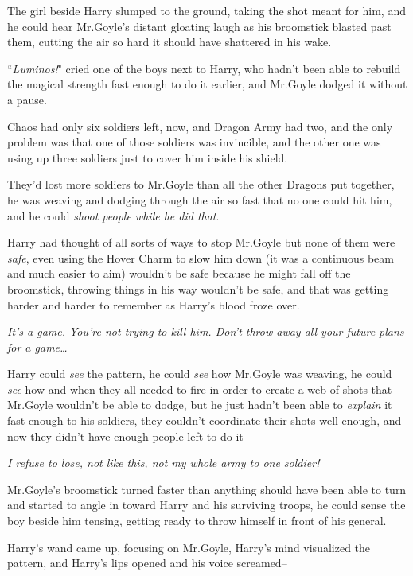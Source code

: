 \later

The girl beside Harry slumped to the ground, taking the shot meant for him, and he could hear Mr.\?Goyle's distant gloating laugh as his broomstick blasted past them, cutting the air so hard it should have shattered in his wake.

``\emph{Luminos!}" cried one of the boys next to Harry, who hadn't been able to rebuild the magical strength fast enough to do it earlier, and Mr.\?Goyle dodged it without a pause.

Chaos had only six soldiers left, now, and Dragon Army had two, and the only problem was that one of those soldiers was invincible, and the other one was using up three soldiers just to cover him inside his shield.

They'd lost more soldiers to Mr.\?Goyle than all the other Dragons put together, he was weaving and dodging through the air so fast that no one could hit him, and he could \emph{shoot people while he did that}.

Harry had thought of all sorts of ways to stop Mr.\?Goyle but none of them were \emph{safe}, even using the Hover Charm to slow him down (it was a continuous beam and much easier to aim) wouldn't be safe because he might fall off the broomstick, throwing things in his way wouldn't be safe, and that was getting harder and harder to remember as Harry's blood froze over.

\emph{It's a game. You're not trying to \emph{kill} him. Don't throw away all your future plans for a game{\ldots}}

Harry could \emph{see} the pattern, he could \emph{see} how Mr.\?Goyle was weaving, he could \emph{see} how and when they all needed to fire in order to create a web of shots that Mr.\?Goyle wouldn't be able to dodge, but he just hadn't been able to \emph{explain} it fast enough to his soldiers, they couldn't coordinate their shots well enough, and now they didn't have enough people left to do it\---

\emph{I refuse to lose, not like this, not my whole army to one soldier!}

Mr.\?Goyle's broomstick turned faster than anything should have been able to turn and started to angle in toward Harry and his surviving troops, he could sense the boy beside him tensing, getting ready to throw himself in front of his general.

\emph{}

Harry's wand came up, focusing on Mr.\?Goyle, Harry's mind visualized the pattern, and Harry's lips opened and his voice screamed\---

